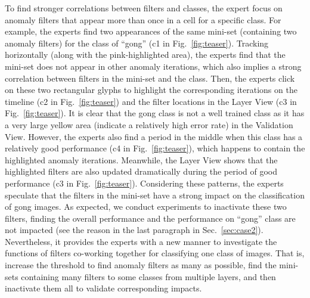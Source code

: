 \documentclass[format=acmsmall, review=false, screen=true]{acmart}
\begin{document}
To find stronger correlations between filters and classes, the expert focus on anomaly filters that appear more than once in a cell for a specific class.
For example, the experts find two appearances of the same mini-set (containing two anomaly filters) for the class of ``gong'' (c1 in Fig.~\ref{fig:teaser}).
Tracking horizontally (along with the pink-highlighted area), the experts find that the mini-set does not appear in other anomaly iterations, which also implies a strong correlation between filters in the mini-set and the class.
Then, the experts click on these two rectangular glyphs to highlight the corresponding iterations on the timeline (c2 in Fig.~\ref{fig:teaser}) and the filter locations in the Layer View (c3 in Fig.~\ref{fig:teaser}).
It is clear that the gong class is not a well trained class as it has a very large yellow area (indicate a relatively high error rate) in the Validation View.
However, the experts also find a period in the middle when this class has a relatively good performance (c4 in Fig.~\ref{fig:teaser}), which happens to contain the highlighted anomaly iterations.
Meanwhile, the Layer View shows that the highlighted filters are also updated dramatically during the period of good performance (c3 in Fig.~\ref{fig:teaser}).
Considering these patterns, the experts speculate that the filters in the mini-set have a strong impact on the classification of gong images.
As expected, we conduct experiments to inactivate these two filters, finding the overall performance and the performance on ``gong'' class are not impacted (see the reason in the last paragraph in Sec.~\ref{sec:case2}). Nevertheless, it provides the experts with a new manner to investigate the functions of filters co-working together for classifying one class of images. That is, increase the threshold to find anomaly filters as many as possible, find the mini-sets containing many filters to some classes from multiple layers, and then inactivate them all to validate corresponding impacts.
\end{document}
